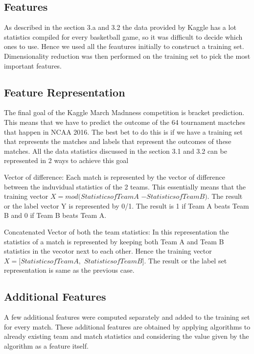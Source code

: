 \documentclass{article}
\begin{document}
\begin{multicols}{2}
	\section{Features}
	As described in the section 3.a and 3.2 the data provided by Kaggle has a lot statistics compiled for every
basketball game, so it was difficult to decide which ones to use. Hence we used all the feautures initially to construct a training set. Dimensionality reduction was then performed on the training set to pick the most important features.

	\subsection{Feature Representation}
	The final goal of the Kaggle March Madnness competition is bracket prediction. This means that we have to predict the outcome of the 64 tournament mactches that happen in NCAA 2016. The best bet to do this is if we have a training set that represents the matches and labels that represent the outcomes of these matches. All the data statistics discussed in the section 3.1 and 3.2 can be represented in 2 ways to achieve this goal
\begin{list}{•}	
\item
	Vector of difference: Each match is represented by the vector of difference between the induvidual statistics of the 2 teams. This essentially means that the training vector \linebreak 
	$X  =  mod(Statistics of Team A $
	\linebreak	
	$- Statistics of Team B)$. 
	\linebreak
	The result or the label vector Y is represented by 0/1. The result is 1 if Team A beats Team B 
and 0 if Team B beats Team A.
	
	\item 
	Concatenated Vector of both the team statistics: In this representation the statistics of a match is represented by keeping both Team A and Team B statistics in the vecotor next to each other. Hence the training vector 		\linebreak
	$X = [Statistics of Team A , $
	\linebreak	
	$Statistics of Team B]$.
	\linebreak
	The result or the label set representation is same as the previous case.
	\end{list}
	
	\subsection{Additional Features}
	A few additional features were computed separately and added to the training set for every match. These additional features are obtained by applying algorithms to already existing team and match statistics and considering the value given by the algorithm as a feature itself. 

\end{multicols}
\end{document}
